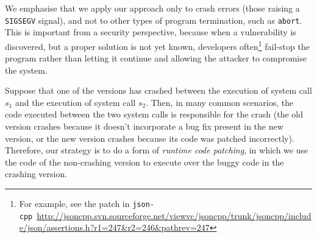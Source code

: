 We emphasise that we apply our approach only to crash errors (those
raising a \lstinline`SIGSEGV` signal), and not to other types of program
termination, such as \lstinline`abort`.  This is important from a
security perspective, because
when a vulnerability is discovered, but a proper solution is not yet
known, developers often\footnote{For example, see the patch in \texttt{json-cpp}~\url{http://jsoncpp.svn.sourceforge.net/viewvc/jsoncpp/trunk/jsoncpp/include/json/assertions.h?r1=247&r2=246&pathrev=247}}
fail-stop the program rather than letting it continue and allowing
the attacker to compromise the system.
%

Suppose that one of the versions has crashed between the execution of
system call $s_1$ and the execution of system call $s_2$.  Then, in
many common scenarios, the code executed between the two system calls
is responsible for the crash (\eg the old version crashes because it
doesn't incorporate a bug fix present in the new version, or the new
version crashes because its code was patched incorrectly).  Therefore,
our strategy is to do a form of \textit{runtime code patching}, in
which we use the code of the non-crashing version to execute over the
buggy code in the crashing version.





